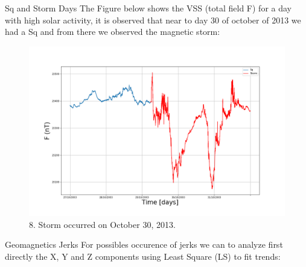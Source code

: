 \documentclass[final,t]{beamer}
\begin{document}
\begin{columns}[t]
\begin{column}{.25\linewidth}
\begin{block}{Sq and Storm Days}
	\justifying
The Figure below shows the VSS (total field F) for a day with high solar activity, it is observed that near to day 30 of october of 2013 we had a Sq and from there we observed the magnetic storm: 

	\begin{figure}
		\centering
		\includegraphics[scale=0.5]{F27_31_october(2003)}
		\caption{8. Storm occurred on October 30, 2013.}
		\label{fig:F27_31_october(2003)}
	\end{figure}
	
	
\end{block}	

	\begin{block}{Geomagnetics Jerks}
		\justifying
		For possibles occurence of jerks we can to analyze first directly the X, Y and Z components using Least Square (LS) to fit trends: 	
		

\end{block}
\end{column}
\end{columns}
\end{document}

